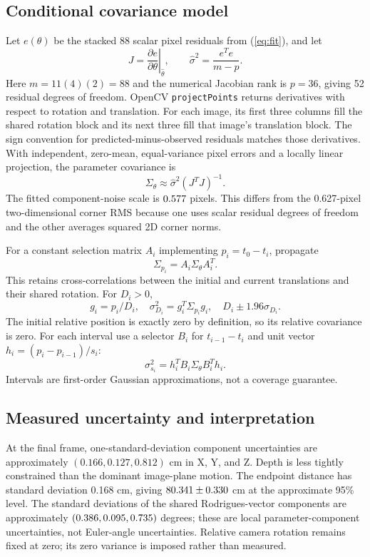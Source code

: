 \documentclass[conference,letterpaper]{IEEEtran}
\newcommand{\code}[1]{\nolinkurl{#1}}
\begin{document}
\subsection{Conditional covariance model}
Let $e(\theta)$ be the stacked 88 scalar pixel residuals from (\ref{eq:fit}), and let
\begin{equation}
J=\left.\frac{\partial e}{\partial\theta}\right|_{\widehat\theta},\qquad
\widehat\sigma^2=\frac{e^Te}{m-p}.
\end{equation}
Here $m=11(4)(2)=88$ and the numerical Jacobian rank is $p=36$, giving 52 residual degrees of freedom. OpenCV \code{projectPoints} returns derivatives with respect to rotation and translation. For each image, its first three columns fill the shared rotation block and its next three fill that image's translation block. The sign convention for predicted-minus-observed residuals matches those derivatives. With independent, zero-mean, equal-variance pixel errors and a locally linear projection, the parameter covariance is
\begin{equation}
\Sigma_\theta\approx\widehat\sigma^2(J^TJ)^{-1}.
\end{equation}
The fitted component-noise scale is $0.577$ pixels. This differs from the 0.627-pixel two-dimensional corner RMS because one uses scalar residual degrees of freedom and the other averages squared 2D corner norms.

For a constant selection matrix $A_i$ implementing $p_i=t_0-t_i$, propagate
\begin{equation}
\Sigma_{p_i}=A_i\Sigma_\theta A_i^T.
\end{equation}
This retains cross-correlations between the initial and current translations and their shared rotation. For $D_i>0$,
\begin{equation}
g_i=p_i/D_i,\quad \sigma_{D_i}^2=g_i^T\Sigma_{p_i}g_i,\quad
D_i\pm1.96\sigma_{D_i}.
\end{equation}
The initial relative position is exactly zero by definition, so its relative covariance is zero. For each interval use a selector $B_i$ for $t_{i-1}-t_i$ and unit vector $h_i=(p_i-p_{i-1})/s_i$:
\begin{equation}
\sigma_{s_i}^2=h_i^TB_i\Sigma_\theta B_i^Th_i.
\end{equation}
Intervals are first-order Gaussian approximations, not a coverage guarantee.

\subsection{Measured uncertainty and interpretation}
At the final frame, one-standard-deviation component uncertainties are approximately $(0.166,0.127,0.812)$ cm in X, Y, and Z. Depth is less tightly constrained than the dominant image-plane motion. The endpoint distance has standard deviation 0.168 cm, giving $80.341\pm0.330$ cm at the approximate 95\% level. The standard deviations of the shared Rodrigues-vector components are approximately $(0.386,0.095,0.735)$ degrees; these are local parameter-component uncertainties, not Euler-angle uncertainties. Relative camera rotation remains fixed at zero; its zero variance is imposed rather than measured.
\end{document}
